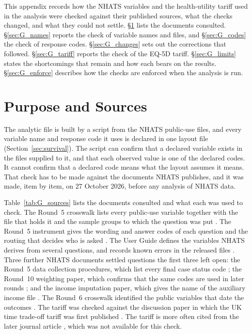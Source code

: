
\label{app:datachecks}

\begin{ataglance}
This appendix records how the NHATS variables and the health-utility tariff
used in the analysis were checked against their published sources, what the
checks changed, and what they could not settle. \S\ref{sec:G_sources} lists
the documents consulted. \S\ref{sec:G_names} reports the check of variable
names and files, and \S\ref{sec:G_codes} the check of response codes.
\S\ref{sec:G_changes} sets out the corrections that followed.
\S\ref{sec:G_tariff} reports the check of the EQ-5D tariff.
\S\ref{sec:G_limits} states the shortcomings that remain and how each bears on
the results. \S\ref{sec:G_enforce} describes how the checks are enforced when
the analysis is run.
\end{ataglance}

\section{Purpose and Sources}
\label{sec:G_sources}

The analytic file is built by a script from the NHATS public-use files, and
every variable name and response code it uses is declared in one layout file
(Section~\ref{sec:survival}). The script can confirm that a declared variable
exists in the files supplied to it, and that each observed value is one of the
declared codes. It cannot confirm that a declared code means what the layout
assumes it means. That check has to be made against the documents NHATS
publishes, and it was made, item by item, on 27 October 2026, before any
analysis of NHATS data.

Table~\ref{tab:G_sources} lists the documents consulted and what each was used
to check. The Round~5 crosswalk lists every public-use variable together with
the file that holds it and the sample groups to which the question was put
\citep{nhats_r5_crosswalk_2024}. The Round~5 instrument gives the wording and
answer codes of each question and the routing that decides who is asked
\citep{nhats_r5_instrument_2024}. The User Guide defines the variables NHATS
derives from several questions, and records known errors in the released files
\citep{freedman_nhats_userguide_2026}. Three further NHATS documents settled
questions the first three left open: the Round~5 data collection procedures,
which list every final case status code \citep{nhats_dcp_r5_2015}; the
Round~10 weighting paper, which confirms that the same codes are used in
later rounds \citep{dematteis_2021_r10weights}; and the income imputation
paper, which gives the name of the auxiliary income file
\citep{hu_freedman_2024_income}. The Round~6 crosswalk identified the public
variables that date the outcomes \citep{nhats_r6_crosswalk_2024}. The tariff was checked against the
discussion paper in which the UK time trade-off tariff was first published
\citep{dolan_1995_che}. The tariff is more often cited from the later journal
article \citep{dolan_1997}, which was not available for this check.

